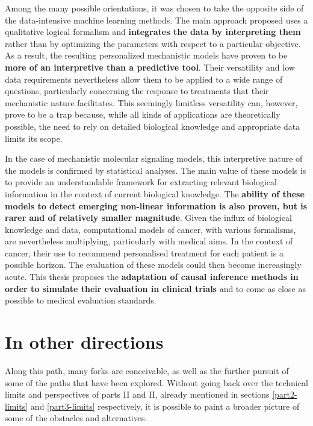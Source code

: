 \documentclass[a4paper,12pt,twoside,onecolumn,openright,final,oldfontcommands]{memoir}
\begin{document}
Among the many possible orientations, it was chosen to take the opposite
side of the data-intensive machine learning methods. The main approach
proposed uses a qualitative logical formalism and \textbf{integrates the
data by interpreting them} rather than by optimizing the parameters with
respect to a particular objective. As a result, the resulting
personalized mechanistic models have proven to be \textbf{more of an
interpretive than a predictive tool}. Their versatility and low data
requirements nevertheless allow them to be applied to a wide range of
questions, particularly concerning the response to treatments that their
mechanistic nature facilitates. This seemingly limitless versatility
can, however, prove to be a trap because, while all kinds of
applications are theoretically possible, the need to rely on detailed
biological knowledge and appropriate data limits its scope.

In the case of mechanistic molecular signaling models, this interpretive
nature of the models is confirmed by statistical analyses. The main
value of these models is to provide an understandable framework for
extracting relevant biological information in the context of current
biological knowledge. The \textbf{ability of these models to detect
emerging non-linear information is also proven, but is rarer and of
relatively smaller magnitude}. Given the influx of biological knowledge
and data, computational models of cancer, with various formalisms, are
nevertheless multiplying, particularly with medical aims. In the context
of cancer, their use to recommend personalised treatment for each
patient is a possible horizon. The evaluation of these models could then
become increasingly acute. This thesis proposes the \textbf{adaptation
of causal inference methods in order to simulate their evaluation in
clinical trials} and to come as close as possible to medical evaluation
standards.

\section{In other directions}\label{in-other-directions}

Along this path, many forks are conceivable, as well as the further
pursuit of some of the paths that have been explored. Without going back
over the technical limits and perspectives of parts II and II, already
mentioned in sections \ref{part2-limits} and \ref{part3-limits}
respectively, it is possible to paint a broader picture of some of the
obstacles and alternatives.
\end{document}
